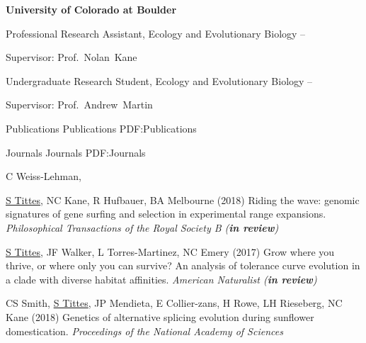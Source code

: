 \documentclass[letterpaper,MMMyyyy,nonstopmode]{simpleresumecv}
\begin{document}
\begin{Body}
\Entry
{\textbf{University of Colorado at Boulder}}

\Gap
\BulletItem
Professional Research Assistant, Ecology and Evolutionary Biology
\hfill
{} --
\begin{Detail}
Supervisor:
Prof.~Nolan~Kane
\end{Detail}

\Entry

\Gap
\BulletItem
Undergraduate Research Student, Ecology and Evolutionary Biology
\hfill
{} --
\begin{Detail}
Supervisor:
Prof.~Andrew~Martin
\end{Detail}


\Section
{Publications}
{Publications}
{PDF:Publications}

\SubSection
{Journals}
{Journals}
{PDF:Journals}

\begingroup
\renewcommand{\MaxNumberedItem}{[200]}



\Gap
\NumberedItem{[9]}
C Weiss-Lehman, {\underline{S Tittes}, NC Kane, R Hufbauer, BA Melbourne
(2018)
Riding the wave: genomic signatures of gene surfing and selection in experimental range expansions.
\textit{Philosophical Transactions of the Royal Society B (\textbf{in review})}

\Gap
\NumberedItem{[7]}
{\underline{S Tittes}, JF Walker, L Torres-Martinez, NC Emery
(2017)
Grow where you thrive, or where only you can survive? An analysis of tolerance curve evolution in a clade with diverse habitat affinities.
\textit{American Naturalist (\textbf{in review})}}



\Gap
\NumberedItem{[8]}
CS Smith, {\underline{S Tittes}, JP Mendieta, E Collier-zans, H Rowe, LH  Rieseberg, NC Kane 
(2018)
Genetics of alternative splicing evolution during sunflower domestication.
\textit{Proceedings of the National Academy of Sciences}}


}
\end{Body}
\end{document}
